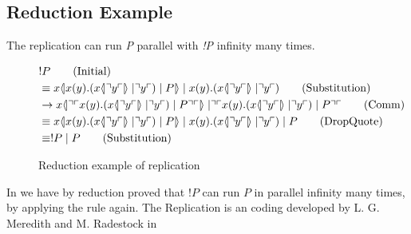 \subsection{Reduction Example}
The replication can run \textit{P} parallel with \textit{!P} infinity many times.






\begin{figure}[h]
    \begin{align}
        &!P \tag{Initial} \\
        &\equiv \lift{x}{\inp{x}{y}(\lift{x}{\drop{y}}\para\drop{y})\para P}\para\inp{x}{y}(\lift{x}{\drop{y}}\para \drop{y}) \tag{Substitution} \\
        &\ra \lift{x}{\drop{\quot{\inp{x}{y}(\lift{x}{\drop{y}}\para\drop{y})\para P}}}\para\drop{\quot{\inp{x}{y}(\lift{x}{\drop{y}}\para\drop{y})\para P}} \tag{Comm}\\
        &\equiv \lift{x}{\inp{x}{y}(\lift{x}{\drop{y}}\para\drop{y})\para P}\para\inp{x}{y}(\lift{x}{\drop{y}}\para \drop{y})\para P \tag{DropQuote} \\
        &\equiv !P\para P \tag{Substitution}
    \end{align}
    \caption{Reduction example of replication}
    \label{fig:reductionexample}
\end{figure}


\noindent
In  we have by reduction proved that $!P$ can run $P$ in parallel infinity many times, by applying the rule again. The Replication is an coding developed by  L. G. Meredith and M. Radestock in \citep{Meredith2005}
